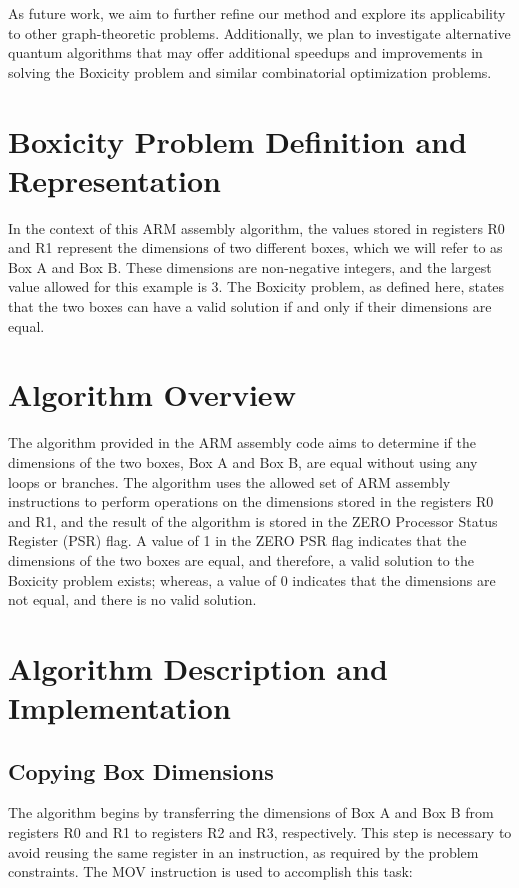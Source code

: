 As future work, we aim to further refine our method and explore its applicability to other graph-theoretic problems. Additionally, we plan to investigate alternative quantum algorithms that may offer additional speedups and improvements in solving the Boxicity problem and similar combinatorial optimization problems.

\section{Boxicity Problem Definition and Representation}

In the context of this ARM assembly algorithm, the values stored in registers R0 and R1 represent the dimensions of two different boxes, which we will refer to as Box A and Box B. These dimensions are non-negative integers, and the largest value allowed for this example is 3. The Boxicity problem, as defined here, states that the two boxes can have a valid solution if and only if their dimensions are equal.

\section{Algorithm Overview}

The algorithm provided in the ARM assembly code aims to determine if the dimensions of the two boxes, Box A and Box B, are equal without using any loops or branches. The algorithm uses the allowed set of ARM assembly instructions to perform operations on the dimensions stored in the registers R0 and R1, and the result of the algorithm is stored in the ZERO Processor Status Register (PSR) flag. A value of 1 in the ZERO PSR flag indicates that the dimensions of the two boxes are equal, and therefore, a valid solution to the Boxicity problem exists; whereas, a value of 0 indicates that the dimensions are not equal, and there is no valid solution.

\section{Algorithm Description and Implementation}

\subsection{Copying Box Dimensions}

The algorithm begins by transferring the dimensions of Box A and Box B from registers R0 and R1 to registers R2 and R3, respectively. This step is necessary to avoid reusing the same register in an instruction, as required by the problem constraints. The MOV instruction is used to accomplish this task:

